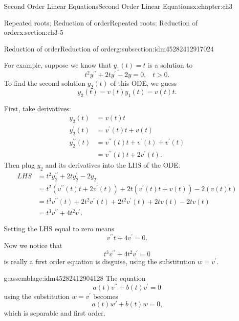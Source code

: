 \documentclass[oneside,10pt,]{book}
\numberwithin{equation}{section}
\numberwithin{equation}{section}
\newcommand{\amp}{&}
\begin{document}
\begin{chapterptx}{Second Order Linear Equations}{}{Second Order Linear Equations}{}{}{x:chapter:ch3}
\begin{sectionptx}{Repeated roots; Reduction of order}{}{Repeated roots; Reduction of order}{}{}{x:section:ch3-5}
\begin{subsectionptx}{Reduction of order}{}{Reduction of order}{}{}{g:subsection:idm45282412917024}
\par
For example, suppose we know that \(y_{1}(t)=t\) is a solution to%
\begin{equation*}
t^{2}y^{\prime\prime}+2ty^{\prime}-2y=0,\,\,\,\,\,t>0.
\end{equation*}
To find the second solution \(y_{2}(t)\) of this ODE, we guess%
\begin{equation*}
y_{2}(t)=v(t)y_{1}(t)=v(t)t.
\end{equation*}
%
\par
First, take derivatives:%
\begin{align*}
y_{2}(t) \amp =v(t)t\\
y_{2}^{\prime}(t) \amp =v^{\prime}(t)t+v(t)\\
y_{2}^{\prime\prime}(t) \amp =v^{\prime\prime}(t)t+v^{\prime}(t)+v^{\prime}(t)\\
\amp =v^{\prime\prime}(t)t+2v^{\prime}(t).
\end{align*}
Then plug \(y_{2}\) and its derivatives into the LHS of the ODE:%
\begin{align*}
LHS\amp =t^{2}y_{2}^{\prime\prime}+2ty_{2}^{\prime}-2y_{2}\\
\amp =t^{2}\left(v^{\prime\prime}(t)t+2v^{\prime}(t)\right) +2t\left(v^{\prime}(t)t+v(t)\right) -2\left(v(t)t\right)\\
\amp =t^{3}v^{\prime\prime}(t)+2t^{2}v^{\prime}(t) +2t^{2}v^{\prime}(t)+2tv(t) -2tv(t)\\
\amp= t^{3}v^{\prime\prime}+4t^{2}v^{\prime}.
\end{align*}
%
\par
Setting the LHS equal to zero means%
\begin{equation*}
v^{\prime\prime}t+4v^{\prime}=0.
\end{equation*}
Now we notice that%
\begin{equation*}
t^{3}v^{\prime\prime}+4t^{2}v^{\prime}=0
\end{equation*}
is really a first order equation is disguise, using the substitution \(w=v^{\prime}\). \begin{assemblage}{}{g:assemblage:idm45282412904128}%
The equation%
\begin{equation*}
a(t)v^{\prime\prime}+b(t)v^{\prime}=0
\end{equation*}
using the substitution \(w=v^{\prime}\) becomes%
\begin{equation*}
a(t) w' + b(t) w = 0\text{,}
\end{equation*}
which is separable and first order.%
\end{assemblage}

\end{subsectionptx}
\end{sectionptx}
\end{chapterptx}
\end{document}
